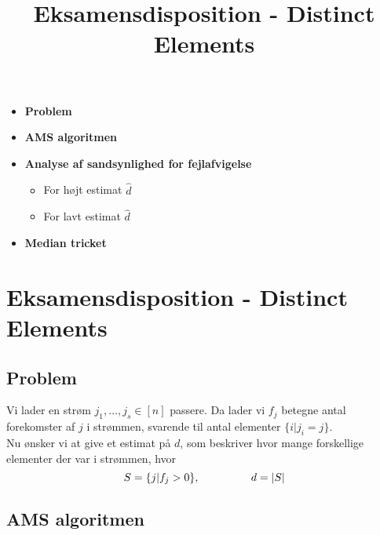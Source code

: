 
\title{Eksamensdisposition - Distinct Elements}


\maketitle

\begin{itemize}
  \item \textbf{Problem}
  \item \textbf{AMS algoritmen}
  \item \textbf{Analyse af sandsynlighed for fejlafvigelse}
  \begin{itemize}
    \item For højt estimat $\hat d$
    \item For lavt estimat $\hat d$
  \end{itemize}
  \item \textbf{Median tricket}
\end{itemize}


\newpage
\section{Eksamensdisposition - Distinct Elements}



\subsection{Problem}
Vi lader en strøm $j_1, \dots, j_s \in [n]$ passere. Da lader vi $f_j$ betegne antal forekomster af $j$ i strømmen, svarende til antal elementer $\{i | j_i = j \}$.\\

Nu ønsker vi at give et estimat på $d$, som beskriver hvor mange forskellige elementer der var i strømmen, hvor
$$
S = \{j | f_j > 0 \}, {\ \ \ \ \ \ \ \ \ \ \ \ \ \ } d = |S|
$$

\subsection{AMS algoritmen}

